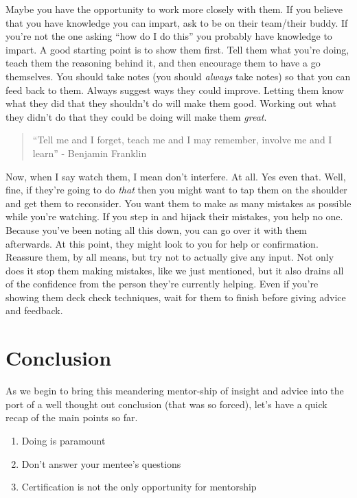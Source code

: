 \documentclass[10pt,a4paper]{article}
\begin{document}
Maybe you have the opportunity to work more closely with them. If you believe that you have knowledge you can impart, ask to be on their team/their buddy. If you're not the one asking ``how do I do this'' you probably have knowledge to impart. A good starting point is to show them first. Tell them what you're doing, teach them the reasoning behind it, and then encourage them to have a go themselves. You should take notes (you should \textit{always} take notes) so that you can feed back to them. Always suggest ways they could improve. Letting them know what they did that they shouldn't do will make them good. Working out what they didn't do that they could be doing will make them \textit{great}.

\begin{quotation}
``Tell me and I forget, teach me and I may remember, involve me and I learn'' - Benjamin Franklin
\end{quotation}

Now, when I say watch them, I mean don't interfere. At all. Yes even that. Well, fine, if they're going to do \textit{that} then you might want to tap them on the shoulder and get them to reconsider. You want them to make as many mistakes as possible while you're watching. If you step in and hijack their mistakes, you help no one. Because you've been noting all this down, you can go over it with them afterwards. At this point, they might look to you for help or confirmation. Reassure them, by all means, but try not to actually give any input. Not only does it stop them making mistakes, like we just mentioned, but it also drains all of the confidence from the person they're currently helping. Even if you're showing them deck check techniques, wait for them to finish before giving advice and feedback.

\section{Conclusion}
As we begin to bring this meandering mentor-ship of insight and advice into the port of a well thought out conclusion (that was so forced), let's have a quick recap of the main points so far.

\begin{enumerate}
	\item Doing is paramount
	\item Don't answer your mentee's questions
	\item Certification is not the only opportunity for mentorship
\end{enumerate}
\end{document}
